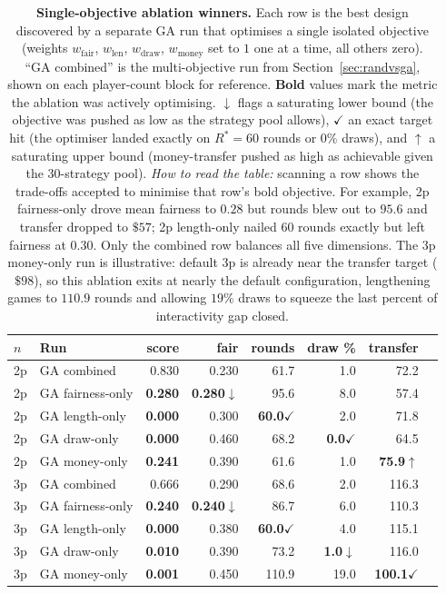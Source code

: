 \documentclass[10pt]{article}
\begin{document}
\begin{table}[h!]
\centering
\small
\begin{tabular}{llrrrrrr}
\toprule
$n$ & Run             & score & fair & rounds & draw \% & transfer \\
\midrule
2p & GA combined      & 0.830 & 0.230 & 61.7 & 1.0  & 72.2 \\
2p & GA fairness-only & \textbf{0.280} & \textbf{0.280}$\downarrow$ & 95.6 & 8.0  & 57.4 \\
2p & GA length-only   & \textbf{0.000} & 0.300 & \textbf{60.0}$\checkmark$ & 2.0  & 71.8 \\
2p & GA draw-only     & \textbf{0.000} & 0.460 & 68.2 & \textbf{0.0}$\checkmark$ & 64.5 \\
2p & GA money-only    & \textbf{0.241} & 0.390 & 61.6 & 1.0  & \textbf{75.9}$\uparrow$ \\
\midrule
3p & GA combined      & 0.666 & 0.290 & 68.6 & 2.0  & 116.3 \\
3p & GA fairness-only & \textbf{0.240} & \textbf{0.240}$\downarrow$ & 86.7 & 6.0  & 110.3 \\
3p & GA length-only   & \textbf{0.000} & 0.380 & \textbf{60.0}$\checkmark$ & 4.0  & 115.1 \\
3p & GA draw-only     & \textbf{0.010} & 0.390 & 73.2 & \textbf{1.0}$\downarrow$ & 116.0 \\
3p & GA money-only    & \textbf{0.001} & 0.450 & 110.9 & 19.0 & \textbf{100.1}$\checkmark$ \\
\bottomrule
\end{tabular}
\caption{\textbf{Single-objective ablation winners.} Each row is the
best design discovered by a separate GA run that optimises a single
isolated objective (weights $w_{\text{fair}}$, $w_{\text{len}}$,
$w_{\text{draw}}$, $w_{\text{money}}$ set to $1$ one at a time, all
others zero). ``GA combined'' is the multi-objective run from
Section~\ref{sec:randvsga}, shown on each player-count block for
reference. \textbf{Bold} values mark the metric the ablation was actively
optimising. $\downarrow$ flags a saturating lower bound (the objective
was pushed as low as the strategy pool allows), $\checkmark$ an exact
target hit (the optimiser landed exactly on $R^*{=}60$ rounds or
$0\%$ draws), and $\uparrow$ a saturating upper bound (money-transfer
pushed as high as achievable given the 30-strategy pool). \emph{How to
read the table:} scanning a row shows the trade-offs accepted to
minimise that row's bold objective. For example, 2p fairness-only drove
mean fairness to $0.28$ but rounds blew out to $95.6$ and transfer
dropped to $\$57$; 2p length-only nailed 60 rounds exactly but left
fairness at $0.30$. Only the combined row balances all five dimensions.
The 3p money-only run is illustrative: default 3p is already near the
transfer target ($\$98$), so this ablation exits at nearly the default
configuration, lengthening games to $110.9$ rounds and allowing $19\%$
draws to squeeze the last percent of interactivity gap closed.}
\label{tab:ablation}
\end{table}
\end{document}
